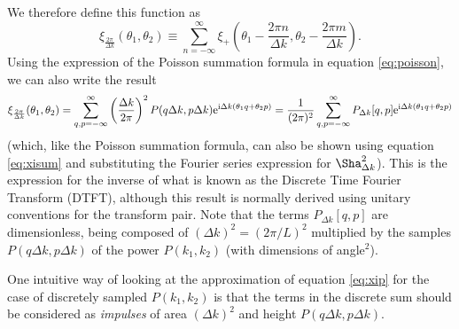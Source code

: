 \documentclass[preprint]{aastex}
\newcommand{\mi}{{\rm i}}
\newcommand{\me}{{\rm e}}
\begin{document}
We therefore define this function as
\begin{equation}
\xi_{\frac{2\pi}{\Delta k}}(\theta_1, \theta_2) \equiv \sum_{n = -\infty}^{\infty} \xi_+\left(\theta_1
- \frac{2 \pi n}{\Delta k},  \theta_2
- \frac{2 \pi m}{\Delta k} \right).
\end{equation}
Using the expression of the Poisson summation formula in equation
\eqref{eq:poisson}, we can also write the result
\begin{equation}
\xi_{\frac{2\pi}{\Delta k}}(\theta_1, \theta_2) =
\sum_{q,p=-\infty}^{\infty} \left( \frac{\Delta k}{2 \pi} \right)^2 P(q \Delta k, p \Delta k) \me^{\mi \Delta
  k (\theta_1 q + \theta_2 p)} = \frac{1}{( 2 \pi)^2}
\sum_{q,p=-\infty}^{\infty} P_{\Delta k} [q, p] \me^{\mi \Delta
  k (\theta_1 q + \theta_2 p)} \label{eq:dtft} 
\end{equation}
(which, like the Poisson summation formula, can also be shown using
equation \ref{eq:xisum} and substituting the Fourier series expression
for $\Sha^2_{\Delta k}$).  This is the expression for the inverse of
what is known as the Discrete Time Fourier Transform (DTFT), although
this result is normally derived using unitary conventions for the
transform pair.  Note that the terms $P_{\Delta k}[q, p]$ are
dimensionless, being composed of $(\Delta k)^2 = (2 \pi / L)^2$
multiplied by the samples $P(q \Delta k, p \Delta k)$ of the power
$P(k_1, k_2)$ (with dimensions of angle$^2$).

One intuitive way of looking at the approximation of equation \eqref{eq:xip} for the case of discretely
sampled $P(k_1, k_2)$ is that the terms in the discrete sum should be
considered as \emph{impulses} of area $(\Delta k)^2$ and height $P(q \Delta k, p \Delta k)$.
\end{document}
